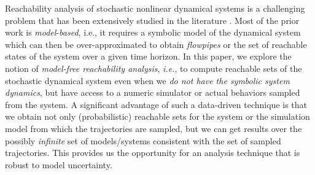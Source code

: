 

Reachability analysis of stochastic nonlinear dynamical systems is a challenging problem that has been 
extensively studied in the literature \cite{vinod2021stochastic,abate2008probabilistic,abate2007computational,
Maria,huang2019reachnn,huang2022polar,chen2013flow,dutta2019sherlock,koutsoukos2006computational,bansal2017hamilton,bortolussi2014statistical,kwiatkowska2007stochastic,legay2019statistical}. 
Most of the prior work is {\em model}-{\em based}, i.e., it requires a symbolic model of the
dynamical system which can then be over-approximated to obtain {\em flowpipes} or the set of reachable 
states of the system over a given time horizon. In this paper, we explore the notion of {\em model-free 
reachability analysis}, {\em i.e.}, to compute reachable sets of the stochastic dynamical system
even when we {\em do not have the symbolic system dynamics}, but have access to a numeric simulator or 
actual behaviors sampled from the system.  A significant 
advantage of such a data-driven technique is that we obtain not only (probabilistic) reachable sets for the
system or the simulation model from which the trajectories are sampled, but we can get results 
over the possibly {\em infinite} set of models/systems consistent with the set of sampled trajectories. 
This provides us the opportunity for an analysis technique that is robust to model uncertainty. 

